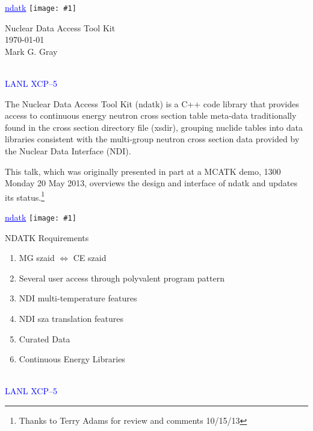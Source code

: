 \documentclass[clock]{slides}
\newenvironment{xslide}[1][logo.jpg]{\begin{slide} \tiny
\textcolor{blue}{\underline{ndatk}} \hfill
\texttt{[image: \#1]}
\normalsize}{\vfill\tiny
\textcolor{blue}{\hrulefill \\LANL XCP--5}
\end{slide}}
\begin{document}
\begin{xslide}

\begin{center}\Large
Nuclear Data Access Tool Kit\\
\today\\
\vspace{2in}
Mark G. Gray\\ 
\end{center}

\end{xslide}

\begin{note}\small
The Nuclear Data Access Tool Kit (ndatk) is a C++ code library that
provides access to continuous energy neutron cross section table
meta-data traditionally found in the cross section directory file
(xsdir), grouping nuclide tables into data libraries consistent with
the multi-group neutron cross section data provided by the Nuclear
Data Interface (NDI).

This talk, which was originally presented in part at a MCATK demo,
1300 Monday 20 May 2013, overviews the design and interface of ndatk
and updates its status.\footnote{Thanks to Terry Adams for review and
  comments 10/15/13}
\end{note}

\begin{xslide}
\begin{center}\large
NDATK Requirements
\end{center}

\begin{enumerate}
\item MG szaid $\Leftrightarrow$ CE szaid
\item Several user access through polyvalent program pattern
\item NDI multi-temperature features
\item NDI sza translation features
\item Curated Data
\item Continuous Energy Libraries
\end{enumerate}
\end{xslide}
\end{document}
